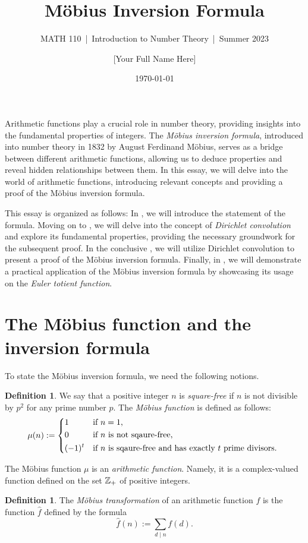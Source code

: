 \documentclass[11pt]{article}
\title{Möbius Inversion Formula}
\author{[Your Full Name Here]}
\subtitle{MATH 110~|~Introduction to Number Theory~|~Summer 2023}
\date{\today}
\theoremstyle{plain}
\theoremstyle{definition}
\newtheorem{definition}[theorem]{Definition}
\theoremstyle{remark}
\numberwithin{equation}{section}
\begin{document}
\maketitle

Arithmetic functions play a crucial role in number theory, providing insights into the fundamental properties of integers. 
The \emph{Möbius inversion formula}, introduced into number theory in 1832 by August Ferdinand Möbius, serves as a bridge between different arithmetic functions, allowing us to deduce properties and reveal hidden relationships between them. 
In this essay, we will delve into the world of arithmetic functions, introducing relevant concepts and providing a proof of the Möbius inversion formula.

This essay is organized as follows: 
In , we will introduce the statement of the formula. 
Moving on to , we will delve into the concept of \emph{Dirichlet convolution} and explore its fundamental properties, providing the necessary groundwork for the subsequent proof.
In the conclusive , we will utilize Dirichlet convolution to present a proof of the Möbius inversion formula. 
Finally, in , we will demonstrate a practical application of the Möbius inversion formula by showcasing its usage on the \emph{Euler totient function}.

\section{The Möbius function and the inversion formula}\label{sec:1}

To state the Möbius inversion formula, we need the following notions.
\begin{definition}
	We say that a positive integer $n$ is \emph{square-free} if $n$ is not divisible by $p^2$ for any prime number $p$.  
	The \emph{Möbius function} is defined as follows:
	\[
		\mu(n) := 
		\begin{dcases*}
			1 & if $n=1$,\\
			0 & if $n$ is not sqaure-free,\\
			(-1)^{t} & if $n$ is sqaure-free and has exactly $t$ prime divisors.
		\end{dcases*}
	\]
\end{definition}
The Möbius function $\mu$ is an \emph{arithmetic function}. Namely, it is a complex-valued function defined on the set $\mathbb{Z}_{+}$ of positive integers.
\begin{definition}
	The \emph{Möbius transformation} of an arithmetic function $f$ is the function $\widehat{f}$ defined by the formula 
	\begin{equation}\label{eq:1}
		\widehat{f}(n) := \sum_{d\mid n} f(d).
	\end{equation} 
\end{definition}
\end{document}
